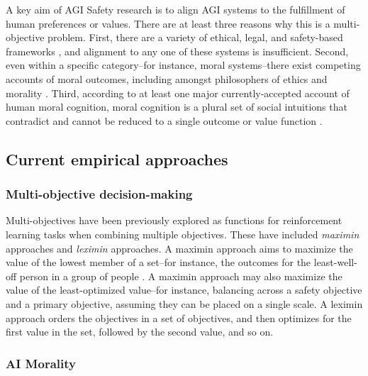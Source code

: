 

A key aim of AGI Safety research is to align AGI systems to the fulfillment of human preferences \cite{Bostrom2014, russell2019human} or values. There are at least three reasons why this is a multi-objective problem. First, there are a variety of ethical, legal, and safety-based frameworks \cite{vamplew_human-aligned_2018}, and alignment to any one of these systems is insufficient. Second, even within a specific category--for instance, moral systems--there exist competing accounts of moral outcomes, including amongst philosophers of ethics and morality \cite{bogosian_implementation_2017}. Third, according to at least one major currently-accepted account of human moral cognition, moral cognition is a plural set of social intuitions that contradict and cannot be reduced to a single outcome or value function \cite{haidt2001emotional,sotala2016defining}.

\subsection{Current empirical approaches}

\subsubsection{Multi-objective decision-making}
Multi-objectives have been previously explored \cite{vamplew_human-aligned_2018,vamplew_potential-based_2021} as functions for reinforcement learning tasks when combining multiple objectives. 
These have included \textit{maximin} approaches and \textit{leximin} approaches. A maximin approach aims to maximize the value of the lowest member of a set--for instance, the outcomes for the least-well-off person in a group of people \cite{rawls2001justice}. A maximin approach may also maximize the value of the least-optimized value--for instance, balancing across a safety objective and a primary objective, assuming they can be placed on a single scale. A leximin approach orders the objectives in a set of objectives, and then optimizes for the first value in the set, followed by the second value, and so on.

\subsubsection{AI Morality}

